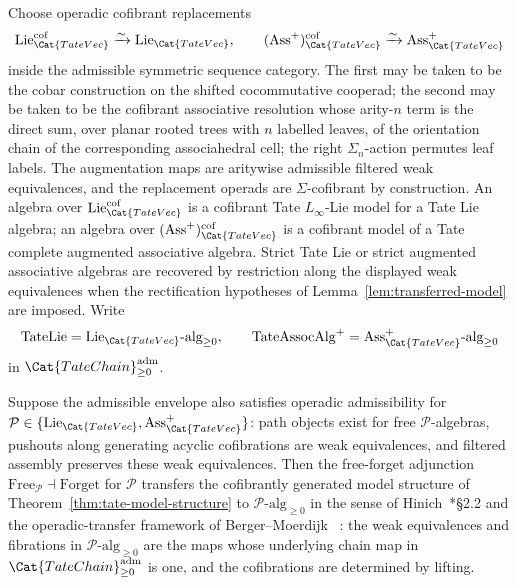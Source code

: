 Choose operadic cofibrant replacements
\[
  \mathrm{Lie}^{\mathrm{cof}}_{\Cat{TateVec}}
    \xrightarrow{\sim}\mathrm{Lie}_{\Cat{TateVec}},
  \qquad
  (\mathrm{Ass}^{+})^{\mathrm{cof}}_{\Cat{TateVec}}
    \xrightarrow{\sim}\mathrm{Ass}^{+}_{\Cat{TateVec}}
\]
inside the admissible symmetric sequence category.  The first may be
taken to be the cobar construction on the shifted cocommutative
cooperad; the second may be taken to be the cofibrant associative
resolution whose arity-\(n\) term is the direct sum, over planar rooted
trees with \(n\) labelled leaves, of the orientation chain of the
corresponding associahedral cell; the right \(\Sigma_n\)-action permutes
leaf labels.  The
augmentation maps are aritywise admissible filtered weak equivalences,
and the replacement operads are \(\Sigma\)-cofibrant by construction.
An algebra over
\(\mathrm{Lie}^{\mathrm{cof}}_{\Cat{TateVec}}\) is a cofibrant
Tate \(L_\infty\)-Lie model for a Tate Lie algebra; an algebra over
\((\mathrm{Ass}^{+})^{\mathrm{cof}}_{\Cat{TateVec}}\) is a cofibrant
model of a Tate complete augmented associative algebra.  Strict Tate
Lie or strict augmented associative algebras are recovered by restriction
along the displayed weak equivalences when the rectification hypotheses
of Lemma~\ref{lem:transferred-model} are imposed.  Write
$$\mathrm{TateLie}=\mathrm{Lie}_{\Cat{TateVec}}\text{-alg}_{\geq 0},
  \qquad \mathrm{TateAssocAlg}^+=
  \mathrm{Ass}^+_{\Cat{TateVec}}\text{-alg}_{\geq 0}$$
in $\Cat{TateChain}_{\geq 0}^{\mathrm{adm}}$.

\begin{lem}
  \label{lem:transferred-model}
  Suppose the admissible envelope also satisfies operadic admissibility
  for \(\mathcal P\in\{\mathrm{Lie}_{\Cat{TateVec}},
  \mathrm{Ass}^+_{\Cat{TateVec}}\}\): path objects exist for free
  \(\mathcal P\)-algebras, pushouts along generating acyclic
  cofibrations are weak equivalences, and filtered assembly preserves
  these weak equivalences.  Then the free-forget adjunction
  $\mathrm{Free}_{\mathcal P}\dashv\mathrm{Forget}$ for
  \(\mathcal P\) transfers the cofibrantly
	  generated model structure of Theorem~\ref{thm:tate-model-structure} to
  $\mathcal P\text{-alg}_{\geq 0}$ in the sense of
	  Hinich~\cite{hinich-htpy-alg}*{\S 2.2} and the operadic-transfer
		  framework of Berger--Moerdijk
		  ~\cite{berger-moerdijk-axiomatic}: the weak equivalences and
  fibrations in $\mathcal P\text{-alg}_{\geq 0}$ are the maps
  whose underlying chain map in
  $\Cat{TateChain}_{\geq 0}^{\mathrm{adm}}$ is one,
  and the cofibrations are determined by lifting.
\end{lem}

